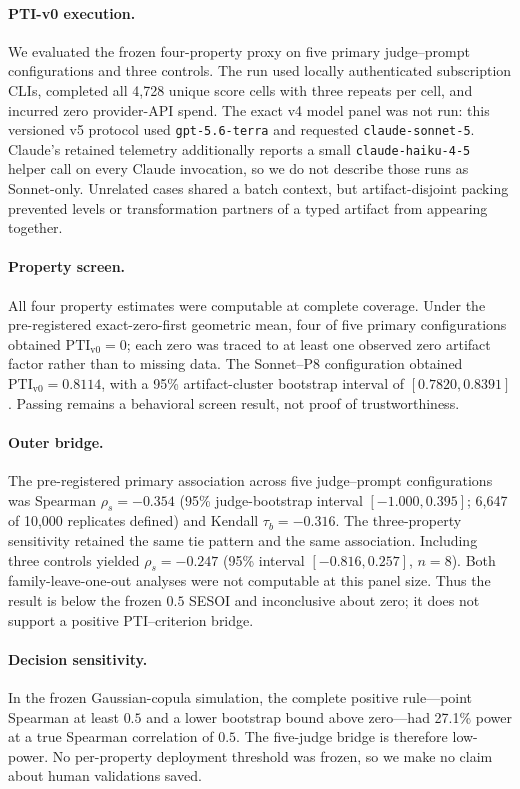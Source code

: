 
\paragraph{PTI-v0 execution.}
We evaluated the frozen four-property proxy on five primary judge--prompt
configurations and three controls.  The run used locally authenticated
subscription CLIs, completed all 4,728 unique score cells with three repeats
per cell, and incurred zero provider-API spend.  The exact v4 model panel was
not run: this versioned v5 protocol used \texttt{gpt-5.6-terra} and requested
\texttt{claude-sonnet-5}.  Claude's retained telemetry additionally reports a
small \texttt{claude-haiku-4-5} helper call on every Claude invocation, so we do
not describe those runs as Sonnet-only.  Unrelated cases shared a batch context,
but artifact-disjoint packing prevented levels or transformation partners of a
typed artifact from appearing together.

\paragraph{Property screen.}
All four property estimates were computable at complete coverage.  Under the
pre-registered exact-zero-first geometric mean, four of five primary
configurations obtained \(\mathrm{PTI}_{\mathrm{v0}}=0\); each zero was traced
to at least one observed zero artifact factor rather than to missing data.  The
Sonnet--P8 configuration obtained
\(\mathrm{PTI}_{\mathrm{v0}}=0.8114\), with a 95\% artifact-cluster bootstrap
interval of \([0.7820,0.8391]\).  Passing remains a behavioral screen result,
not proof of trustworthiness.

\paragraph{Outer bridge.}
The pre-registered primary association across five judge--prompt
configurations was Spearman
\(\rho_s=-0.354\) (95\% judge-bootstrap interval
\([-1.000,0.395]\); 6,647 of 10,000 replicates defined) and Kendall
\(\tau_b=-0.316\).  The three-property sensitivity retained the same tie
pattern and the same association.  Including three controls yielded
\(\rho_s=-0.247\) (95\% interval \([-0.816,0.257]\), \(n=8\)).  Both
family-leave-one-out analyses were not computable at this panel size.  Thus the
result is below the frozen \(0.5\) SESOI and inconclusive about zero; it does not
support a positive PTI--criterion bridge.

\paragraph{Decision sensitivity.}
In the frozen Gaussian-copula simulation, the complete positive rule---point
Spearman at least \(0.5\) and a lower bootstrap bound above zero---had 27.1\%
power at a true Spearman correlation of \(0.5\).  The five-judge bridge is
therefore low-power.  No per-property deployment threshold was frozen, so we
make no claim about human validations saved.
